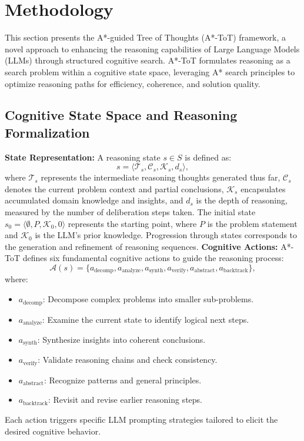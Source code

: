 \documentclass[12pt]{article}
\begin{document}
\section{Methodology}
This section presents the A*-guided Tree of Thoughts (A*-ToT) framework, a novel approach to enhancing the reasoning capabilities of Large Language Models (LLMs) through structured cognitive search. A*-ToT formulates reasoning as a search problem within a cognitive state space, leveraging A* search principles to optimize reasoning paths for efficiency, coherence, and solution quality.
\subsection{Cognitive State Space and Reasoning Formalization}
\textbf{State Representation:} A reasoning state $s \in S$ is defined as:
\[
s = \langle \mathcal{T}_s, \mathcal{C}_s, \mathcal{K}_s, d_s \rangle,
\]
where $\mathcal{T}_s$ represents the intermediate reasoning thoughts generated thus far, $\mathcal{C}_s$ denotes the current problem context and partial conclusions, $\mathcal{K}_s$ encapsulates accumulated domain knowledge and insights, and $d_s$ is the depth of reasoning, measured by the number of deliberation steps taken.
The initial state $s_0 = \langle \emptyset, P, \mathcal{K}_0, 0 \rangle$ represents the starting point, where $P$ is the problem statement and $\mathcal{K}_0$ is the LLM's prior knowledge. Progression through states corresponds to the generation and refinement of reasoning sequences.
\textbf{Cognitive Actions:} A*-ToT defines six fundamental cognitive actions to guide the reasoning process:
\[
\mathcal{A}(s) = \{a_{\text{decomp}}, a_{\text{analyze}}, a_{\text{synth}}, a_{\text{verify}}, a_{\text{abstract}}, a_{\text{backtrack}}\},
\]
where:
\begin{itemize}
    \item $a_{\text{decomp}}$: Decompose complex problems into smaller sub-problems.
    \item $a_{\text{analyze}}$: Examine the current state to identify logical next steps.
    \item $a_{\text{synth}}$: Synthesize insights into coherent conclusions.
    \item $a_{\text{verify}}$: Validate reasoning chains and check consistency.
    \item $a_{\text{abstract}}$: Recognize patterns and general principles.
    \item $a_{\text{backtrack}}$: Revisit and revise earlier reasoning steps.
\end{itemize}
Each action triggers specific LLM prompting strategies tailored to elicit the desired cognitive behavior.
\end{document}
